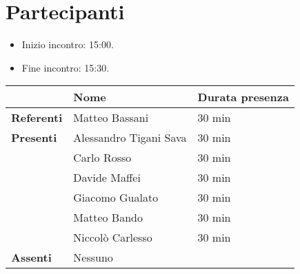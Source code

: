 \section{Partecipanti}

\begin{itemize}
    \item Inizio incontro: 15:00.
    \item Fine incontro: 15:30.
\end{itemize}


\begin{center}
{\renewcommand{\arraystretch}{1.5}
\begin{tabular}{l|ll}
	                    & \textbf{Nome}  & \textbf{Durata presenza} 	\\
	\hline
	\textbf{Referenti} 	& Matteo Bassani 			& 30 min  \\
	
	\hline
	\textbf{Presenti}   & Alessandro Tigani Sava	& 30 min  \\  
						& Carlo Rosso            	& 30 min  \\  
						& Davide Maffei          	& 30 min  \\  
  						& Giacomo Gualato        	& 30 min  \\  
						& Matteo Bando           	& 30 min  \\  
						& Niccolò Carlesso       	& 30 min  \\  
	\hline
	\textbf{Assenti}	& 	     Nessuno    		&	      \\
\end{tabular}	
}
\end{center}